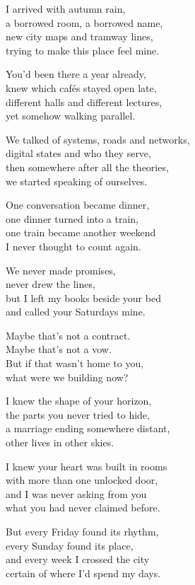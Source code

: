 \begin{lyrics}
I arrived with autumn rain,\\
a borrowed room, a borrowed name,\\
new city maps and tramway lines,\\
trying to make this place feel mine.

You'd been there a year already,\\
knew which cafés stayed open late,\\
different halls and different lectures,\\
yet somehow walking parallel.

We talked of systems, roads and networks,\\
digital states and who they serve,\\
then somewhere after all the theories,\\
we started speaking of ourselves.

One conversation became dinner,\\
one dinner turned into a train,\\
one train became another weekend\\
I never thought to count again.

We never made promises,\\
never drew the lines,\\
but I left my books beside your bed\\
and called your Saturdays mine.

Maybe that's not a contract.\\
Maybe that's not a vow.\\
But if that wasn't home to you,\\
what were we building now?

I knew the shape of your horizon,\\
the parts you never tried to hide,\\
a marriage ending somewhere distant,\\
other lives in other skies.

I knew your heart was built in rooms\\
with more than one unlocked door,\\
and I was never asking from you\\
what you had never claimed before.

But every Friday found its rhythm,\\
every Sunday found its place,\\
and every week I crossed the city\\
certain of where I'd spend my days.


\end{lyrics}

